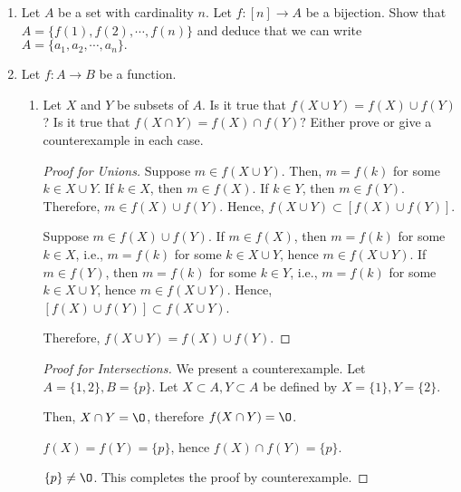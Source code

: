 \documentclass[11pt]{article}
\renewcommand{\emptyset}{\O}
\theoremstyle{definition}
\numberwithin{equation}{subsection}
\begin{document}
\begin{enumerate}
\begin{enumerate}
\begin{proof}
Hence, $h \circ g \circ q' \colon [1+k] \rightarrow [k]$ must be injective (since $q'$ is bijective). We have reached a contradiction, and this completes the proof.

\renewcommand\qedsymbol{QED}
\end{proof}
\end{enumerate}

\item Let $A$ be a set with cardinality $n.$ Let $f\colon [n]\longrightarrow A$ be a bijection. Show that $A=\{f(1),f(2),\cdots,f(n)\}$ and deduce that we can write $A=\{a_1,a_2,\cdots, a_n\}.$ 

\item Let $f: A \to B$ be a function. 
\begin{enumerate}
\item Let $X$ and $Y$ be subsets of $A$. Is it true that $f(X \cup Y) = f(X) \cup f(Y)$? Is it true that  
$f(X\cap Y)= f(X)\cap f(Y)?$ Either prove or give a counterexample in each case.
\begin{proof}[Proof for Unions]
Suppose $m \in f(X \cup Y)$. Then, $m = f(k)$ for some $k \in X \cup Y$. If $k \in X$, then $m \in f(X)$. If $k \in Y$, then $m \in f(Y)$. Therefore, $m \in f(X) \cup f(Y)$. Hence, $f(X \cup Y) \subset [f(X) \cup f(Y)]$.

Suppose $m \in f(X) \cup f(Y)$. If $m \in f(X)$, then $m=f(k)$ for some $k \in X$, i.e., $m=f(k)$ for some $k \in X \cup Y$, hence $m \in f(X \cup Y)$. If $m \in f(Y)$, then $m=f(k)$ for some $k \in Y$, i.e., $m=f(k)$ for some $k \in X \cup Y$, hence $m \in f(X \cup Y)$. Hence, $[f(X) \cup f(Y)] \subset f(X \cup Y)$.

Therefore, $f(X \cup Y) = f(X) \cup f(Y)$.


\renewcommand\qedsymbol{QED}
\end{proof}

\begin{proof}[Proof for Intersections]
We present a counterexample. Let $A = \{1,2\}, B=\{p\}$. Let $X \subset A, Y \subset A$ be defined by $X = \{1\}, Y=\{2\}$. 

Then, $X \cap Y = \emptyset$, therefore $f(X \cap Y) = \emptyset$. 

$f(X)=f(Y)=\{p\}$, hence $f(X)\cap f(Y)=\{p\}$. 

$\{p\} \not = \emptyset$. This completes the proof by counterexample.

\renewcommand\qedsymbol{QED}
\end{proof}


\end{enumerate}
\end{enumerate}
\end{document}
